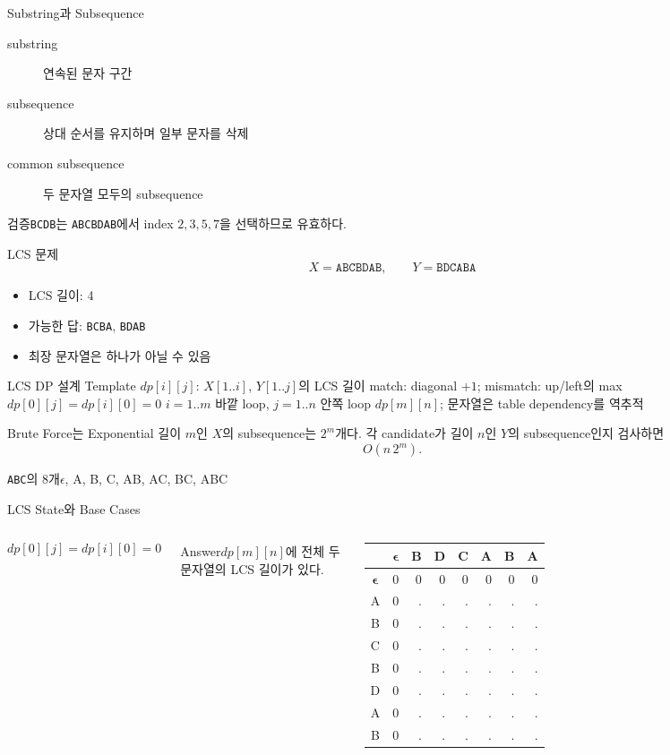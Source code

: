 \begin{frame}{Substring과 Subsequence}
\begin{description}\item[substring] 연속된 문자 구간\item[subsequence] 상대 순서를 유지하며 일부 문자를 삭제\item[common subsequence] 두 문자열 모두의 subsequence\end{description}
\begin{exampleblock}{검증}\texttt{BCDB}는 \texttt{ABCBDAB}에서 index $2,3,5,7$을 선택하므로 유효하다.\end{exampleblock}
\end{frame}
\begin{frame}{LCS 문제}
\[
X=\texttt{ABCBDAB},\qquad Y=\texttt{BDCABA}
\]
\begin{itemize}\item LCS 길이: 4\item 가능한 답: \texttt{BCBA}, \texttt{BDAB}\item 최장 문자열은 하나가 아닐 수 있음\end{itemize}
\end{frame}
\begin{frame}{LCS DP 설계 Template}
\small
\dpdesign
{$dp[i][j]$: $X[1..i]$, $Y[1..j]$의 LCS 길이}
{match: diagonal $+1$; mismatch: up/left의 max}
{$dp[0][j]=dp[i][0]=0$}
{$i=1..m$ 바깥 loop, $j=1..n$ 안쪽 loop}
{$dp[m][n]$; 문자열은 table dependency를 역추적}
\end{frame}
\begin{frame}{Brute Force는 Exponential}
길이 $m$인 $X$의 subsequence는 $2^m$개다. 각 candidate가 길이 $n$인 $Y$의 subsequence인지 검사하면
\[
O(n\,2^m).
\]
\begin{exampleblock}{\texttt{ABC}의 8개}$\epsilon$, A, B, C, AB, AC, BC, ABC\end{exampleblock}
\end{frame}
\begin{frame}{LCS State와 Base Cases}
\begin{columns}[c]
\[
dp[0][j]=dp[i][0]=0
\]
\begin{block}{Answer}$dp[m][n]$에 전체 두 문자열의 LCS 길이가 있다.\end{block}
\centering\small
\renewcommand{\arraystretch}{1.26}\setlength{\tabcolsep}{5.5pt}
\begin{tabular}{c|rrrrrrr}
&$\boldsymbol{\epsilon}$&B&D&C&A&B&A\\\hline
$\boldsymbol{\epsilon}$&0&0&0&0&0&0&0\\
A&0&.&.&.&.&.&.\\
B&0&.&.&.&.&.&.\\
C&0&.&.&.&.&.&.\\
B&0&.&.&.&.&.&.\\
D&0&.&.&.&.&.&.\\
A&0&.&.&.&.&.&.\\
B&0&.&.&.&.&.&.
\end{tabular}
\end{columns}
\end{frame}
